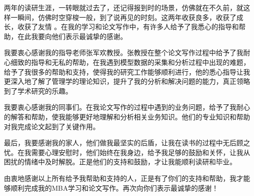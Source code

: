 \acknowledgments
两年的读研生涯，一转眼就过去了，还记得报到时的场景，仿佛就在不久前，就这样一瞬间，仿佛时空穿梭一般，到了说再见的时刻。这两年收获良多，收获了成长，收获了友情 。在我的学习和论文写作中，有许多人给予了我悉心的指导和帮助，在此我要向他们表示最诚挚的感谢。

我要衷心感谢我的指导老师张军欢教授。张教授在整个论文写作过程中给予了我耐心细致的指导和无私的帮助，在我遇到模型数据的采集和分析过程中出现的难题，给予了我很多的帮助和支持，使得我的研究工作能够顺利进行，他的悉心指导让我更深入地了解了管理学的理论知识，提升了我的分析和解决问题的能力，真正领略到了学术研究的乐趣。

我要衷心感谢我的同事们。在我论文写作的过程中遇到的业务问题，给予了我耐心的解答和帮助，使我能够更好地理解和分析相关业务知识。他们的专业知识和帮助对我完成论文起到了关键作用。

最后，我要感谢我的家人，他们做我最坚实的后盾，让我在读书的过程中无后顾之忧。在我需要心理安慰时，他们始终在我身边，给予我足够的鼓励和关怀，让我从困扰的情绪中及时解脱。正是他们的支持和鼓励，才让我能顺利读研和毕业。

由衷地感谢以上所有给予我帮助和支持的人，正是有了你们的支持和帮助，我才能够顺利完成我的MBA学习和论文写作。再次向你们表示最诚挚的感谢！

